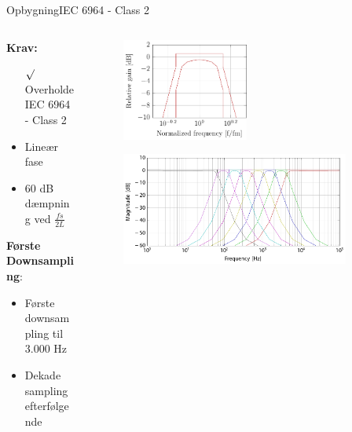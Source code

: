 \begin{frame}{Opbygning}{IEC 6964 - Class 2}

\begin{columns}
  \begin{column}{0.4\textwidth}
\textbf{Krav:}
\begin{itemize}
\item[$\surd$] Overholde IEC 6964 - Class 2 
\item Lineær fase
\item 60 dB dæmpning ved $\frac{fs}{2L}$
\end{itemize}
\textbf{Første Downsampling}:
\begin{itemize}
	\item Første downsampling til 3.000 Hz
	\item Dekade sampling efterfølgende
\end{itemize}
  \end{column}
  \begin{column}{0.6\textwidth}


\begin{figure}
\centering
\includegraphics[width=0.5\textwidth]{Band1ReqZoom}
\end{figure}
\vspace*{-8mm} 
\begin{figure}
\centering
\includegraphics[width=0.9\textwidth]{allBandsExtended}
\end{figure}
  \end{column}
\end{columns}
\end{frame}


